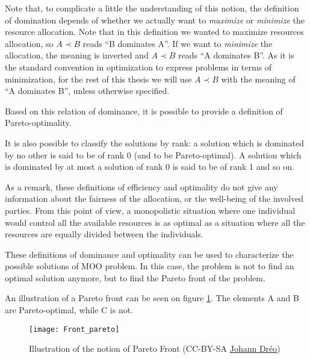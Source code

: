 Note that, to complicate a little the understanding of this notion, the definition of domination depends of whether we actually want to \emph{maximize} or \emph{minimize} the resource allocation. Note that in this definition we wanted to maximize resources allocation, so \(A \prec B\) reads \enquote{B dominates A}. If we want to \emph{minimize} the allocation, the meaning is inverted and  \(A \prec B\) reads \enquote{A dominates B}.
As it is the standard convention in optimization to express problems in terms of minimization, for the rest of this thesis we will use \(A \prec B\) with the meaning of \enquote{A dominates B}, unless otherwise specified.

Based on this relation of dominance, it is possible to provide a definition of Pareto-optimality.



It is also possible to classify the solutions by rank: a solution which is dominated by no other is said to be of rank 0 (and to be Pareto-optimal). A solution which is dominated by at most a solution of rank 0 is said to be of rank 1 and so on.

As a remark, these definitions of efficiency and optimality do not give any information about the fairness of the allocation, or the well-being of the involved parties. From this point of view, a monopolistic situation where one individual would control all the available resources is as optimal as a situation where all the resources are equally divided between the individuals.

These definitions of dominance and optimality can be used to characterize the possible solutions of MOO problem. In this case, the problem is not to find an optimal solution anymore, but to find the Pareto front of the problem.

An illustration of a Pareto front can be seen on figure \ref{Front_Pareto}. The elements A and B are Pareto-optimal, while C is not.

\begin{figure}
\centering
\texttt{[image: Front\_pareto]}\\
\caption{Illustration of the notion of Pareto Front (CC-BY-SA \href{http://en.wikipedia.org/wiki/File:Front_pareto.svg}{Johann Dréo})}
\label{Front_Pareto}
\end{figure}

